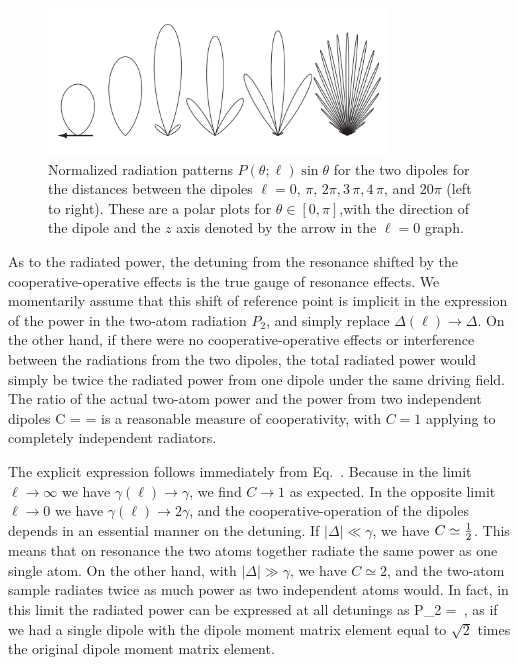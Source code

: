 \begin{figure}[h!]
\begin{center}
\includegraphics[width=0.8\textwidth]{two_atoms.pdf}
\end{center}
\caption[Radiation patterns for two dipoles]{Normalized radiation patterns $P(\theta;\ell)\sin\theta$ for the two dipoles for the distances between the dipoles $\ell=0,\,\pi,\,2\pi,3\,\pi,4\,\pi$, and $20\pi$ (left to right). These are a polar plots for $\theta\in[0,\pi]$,with the direction of the dipole and the $z$ axis denoted by the arrow in the $\ell=0$ graph.}
\label{TWOATOMS}
\end{figure}

As to the radiated power, the detuning from the resonance shifted by the cooperative-operative effects is the true gauge of resonance effects. We momentarily assume that this shift of reference point is implicit in the expression of the power in the two-atom radiation $P_2$, and simply replace $\Delta(\ell)\rightarrow\Delta$. On the other hand, if there were no cooperative-operative effects or interference between the radiations from the two dipoles, the total radiated power would simply be twice the radiated power from one dipole under the same driving field. The ratio of the actual two-atom power and the power from two independent dipoles
\beq
C =  = 
\eeq
is a reasonable measure of cooperativity, with $C=1$ applying to completely independent radiators.

The explicit expression follows immediately from Eq.~. Because in the limit $\ell\rightarrow\infty$ we have $\gamma(\ell)\rightarrow\gamma$, we find $C\rightarrow1$ as expected. In the opposite limit $\ell\rightarrow0$ we have $\gamma(\ell)\rightarrow 2\gamma$, and the cooperative-operation of the dipoles depends in an essential manner on the detuning. If $|\Delta|\ll\gamma$, we have $C\simeq{\hbox{$\frac{1}{2}$}}$. This means that on resonance the two atoms together radiate the same power as one single atom. On the other hand, with $|\Delta|\gg\gamma$, we have $C\simeq2$, and the two-atom sample radiates twice as much power as two independent atoms would. In fact, in this limit the radiated power can be expressed at all detunings as
\beq
P_2 = \,,
\eeq
as if we had a single dipole with the dipole moment matrix element equal to $\sqrt2$ times the original dipole moment matrix element.

